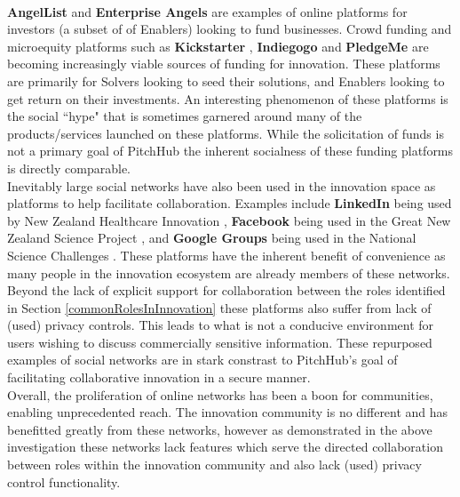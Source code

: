 \\
\newline
\textbf{AngelList} \cite{Angel:online} and \textbf{Enterprise Angels} \cite{enterpriseAngles:online} are examples of online platforms for investors (a subset of of Enablers) looking to fund businesses. Crowd funding and microequity platforms such as \textbf{Kickstarter} \cite{Kicks6:online}, \textbf{Indiegogo} \cite{Indie3:online} and \textbf{PledgeMe} \cite{Pledge:online} are becoming increasingly viable sources of funding for innovation. These platforms are primarily for Solvers looking to seed their solutions, and Enablers looking to get return on their investments. An interesting phenomenon of these platforms is the social ``hype" that is sometimes garnered around many of the products/services launched on these platforms. While the solicitation of funds is not a primary goal of PitchHub the inherent socialness of these funding platforms is directly comparable.
\\
\newline
Inevitably large social networks have also been used in the innovation space as platforms to help facilitate collaboration. Examples include \textbf{LinkedIn} \cite{Linkedin:online} being used by New Zealand Healthcare Innovation \cite{nzHealthCare:online}, \textbf{Facebook} \cite{Faceb6:online} being used in the Great New Zealand Science Project \cite{greatNZScience:online}, and \textbf{Google Groups} \cite{Googlegroups:online} being used in the National Science Challenges \cite{nzNSC10:online}. These platforms have the inherent benefit of convenience as many people in the innovation ecosystem are already members of these networks. Beyond the lack of explicit support for collaboration between the roles identified in Section \ref{commonRolesInInnovation} these platforms also suffer from lack of (used) privacy controls. This leads to what is not a conducive environment for users wishing to discuss commercially sensitive information. These repurposed examples of social networks are in stark constrast to PitchHub's goal of facilitating collaborative innovation in a secure manner.
\\
\newline
Overall, the proliferation of online networks has been a boon for communities, enabling unprecedented reach. The innovation community is no different and has benefitted greatly from these networks, however as demonstrated in the above investigation these networks lack features which serve the directed collaboration between roles within the innovation community and also lack (used) privacy control functionality.

